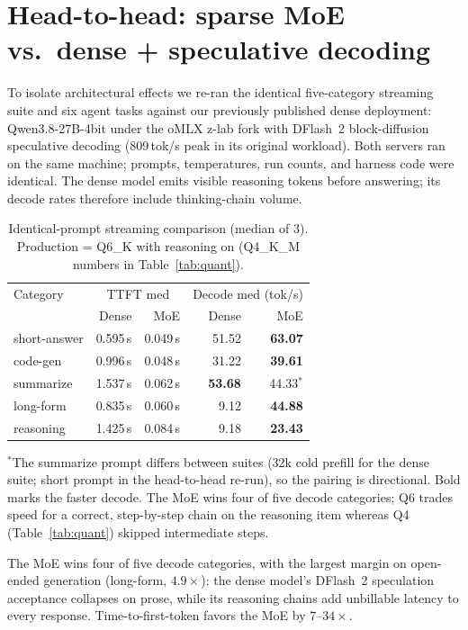\documentclass[11pt]{article}
\begin{document}
\section{Head-to-head: sparse MoE vs.\ dense + speculative decoding}
\label{sec:h2h}

To isolate architectural effects we re-ran the identical five-category
streaming suite and six agent tasks against our previously published dense
deployment: Qwen3.8-27B-4bit under the oMLX z-lab fork with DFlash~2
block-diffusion speculative decoding (809\,tok/s peak in its original
workload). Both servers ran on the same machine; prompts, temperatures, run
counts, and harness code were identical. The dense model emits visible
reasoning tokens before answering; its decode rates therefore include
thinking-chain volume.

\begin{table}[h]
\centering
\caption{Identical-prompt streaming comparison (median of 3). Production = Q6\_K with reasoning on (Q4\_K\_M numbers in Table~\ref{tab:quant}).}
\label{tab:h2h}
\begin{tabular}{lrrrr}
\toprule
Category & \multicolumn{2}{c}{TTFT med} & \multicolumn{2}{c}{Decode med (tok/s)} \\
 & Dense & MoE & Dense & MoE \\
\midrule
short-answer & 0.595\,s & 0.049\,s & 51.52 & \textbf{63.07} \\
code-gen     & 0.996\,s & 0.048\,s & 31.22 & \textbf{39.61} \\
summarize    & 1.537\,s & 0.062\,s & \textbf{53.68} & 44.33$^{*}$ \\
long-form    & 0.835\,s & 0.060\,s & 9.12 & \textbf{44.88} \\
reasoning    & 1.425\,s & 0.084\,s & 9.18 & \textbf{23.43} \\
\bottomrule
\end{tabular}

\smallskip
{\footnotesize $^{*}$The summarize prompt differs between suites (32k cold prefill for the
dense suite; short prompt in the head-to-head re-run), so the pairing is
directional. Bold marks the faster decode. The MoE wins four of five decode
categories; Q6 trades speed for a correct, step-by-step chain on the reasoning
item whereas Q4 (Table~\ref{tab:quant}) skipped intermediate steps.}
\end{table}

The MoE wins four of five decode categories, with the largest margin on
open-ended generation (long-form, $4.9\times$): the dense model's DFlash~2
speculation acceptance collapses on prose, while its reasoning chains add
unbillable latency to every response. Time-to-first-token favors the MoE by
$7$--$34\times$.
\end{document}

